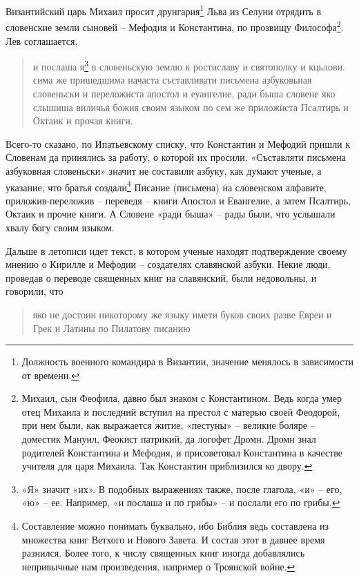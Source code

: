 Византийский царь Михаил просит друнгария\footnote{Должность военного командира в Византии, значение менялось в зависимости от времени.} Льва из Селуни отрядить в словенские земли сыновей – Мефодия и Константина, по прозвищу Философа\footnote{Михаил, сын Феофила, давно был знаком с Константином. Ведь когда умер отец Михаила и последний вступил на престол с матерью своей Феодорой, при нем были, как выражается житие, «пестуны» – великие боляре – доместик Мануил, Феокист патрикий, да логофет Дромн. Дромн знал родителей Константина и Мефодия, и присоветовал Константина в качестве учителя для царя Михаила. Так Константин приблизился ко двору.}. Лев соглашается,

\begin{quotation}
и послаша я\footnote{«Я» значит «их». В подобных выражениях также, после глагола, «и» – его, «ю» – ее. Например, «и послаша и по грибы» – и послали его по грибы.} в словеньскую землю к ростиславу и святополку и кцьлови. сима же пришедшима начаста съставливати письмена азбуковьная словеньски и переложиста апостол и еуангелие, ради быша словене яко слышиша виличья божия своим языком по сем же приложиста Псалтирь и Октаик и прочая книги.
\end{quotation}

Всего-то сказано, по Ипатьевскому списку, что Константин и Мефодий пришли к Словенам да принялись за работу, о которой их просили.  «Съставляти письмена азбуковная словеньски» значит не составили азбуку, как думают ученые, а указание, что братья создали\footnote{Составление можно понимать буквально, ибо Библия ведь составлена из множества книг Ветхого и Нового Завета. И состав этот в давнее время разнился. Более того, к числу священных книг иногда добавлялись непривычные нам произведения, например о Троянской войне.} Писание (письмена) на словенском алфавите, приложив-переложив – переведя – книги Апостол и Евангелие, а затем Псалтирь, Октаик и прочие книги. А Словене «ради быша» – рады были, что услышали хвалу богу своим языком. 

Дальше в летописи идет текст, в котором ученые находят подтверждение своему мнению о Кирилле и Мефодии – создателях славянской азбуки. Некие люди, проведав о переводе священных книг на славянский, были недовольны, и говорили, что 

\begin{quotation}
яко не достоин никоторому же языку имети буков своих разве Евреи и Грек и Латины по Пилатову писанию
\end{quotation}

